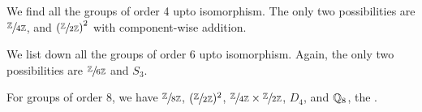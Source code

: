 \begin{example}
    We find all the groups of order 4 upto isomorphism. The only two possibilities are $\sfrac{\mathbb{Z}}{4\mathbb{Z}}$, and $\left( \sfrac{\mathbb{Z}}{2\mathbb{Z}} \right)^{2}$ with component-wise addition.
\end{example}

\begin{example}
    We list down all the groups of order 6 upto isomorphism. Again, the only two possibilities are $\sfrac{\mathbb{Z}}{6\mathbb{Z}}$ and $S_{3}$.
\end{example}

\begin{example}
    For groups of order 8, we have $\sfrac{\mathbb{Z}}{8\mathbb{Z}}$, $(\sfrac{\mathbb{Z}}{2\mathbb{Z}})^{2}$, $\sfrac{\mathbb{Z}}{4\mathbb{Z}} \times \sfrac{\mathbb{Z}}{2\mathbb{Z}}$, $D_{4}$, and $\mathbb{Q}_{8}$, the .
\end{example}